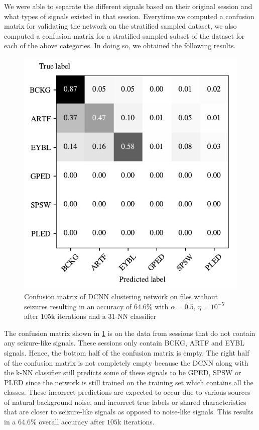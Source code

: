 We were able to separate the different signals based on their original session and what types of signals existed in that session. Everytime we computed a confusion matrix for validating the network on the stratified sampled dataset, we also computed a confusion matrix for a stratified sampled subset of the dataset for each of the above categories. In doing so, we obtained the following results. 

\begin{figure}[!ht]
	\centering
	\includegraphics[width=0.55\linewidth]{pictures/conf_mat_exp_without_seizure.pdf}
	\caption[Confusion Matrix on Sessions without Seizure-Like Signals]{Confusion matrix of DCNN clustering network on files without seizures resulting in an accuracy of $64.6\%$ with $\alpha = 0.5$, $\eta = 10^{-5}$ after $105$k iterations and a 31-NN classifier}\label{fig:conf_mat_exp_without_seizure}  
\end{figure}

The confusion matrix shown in \cref{fig:conf_mat_exp_without_seizure} is on the data from sessions that do not contain any seizure-like signals. These sessions only contain BCKG, ARTF and EYBL signals. Hence, the bottom half of the confusion matrix is empty. The right half of the confusion matrix is not completely empty because the DCNN along with the k-NN classifier still predicts some of these signals to be GPED, SPSW or PLED since the network is still trained on the training set which contains all the classes. These incorrect predictions are expected to occur due to various sources of natural background noise, and incorrect true labels or shared characteristics that are closer to seizure-like signals as opposed to noise-like signals. This results in a $64.6\%$ overall accuracy after $105$k iterations.

